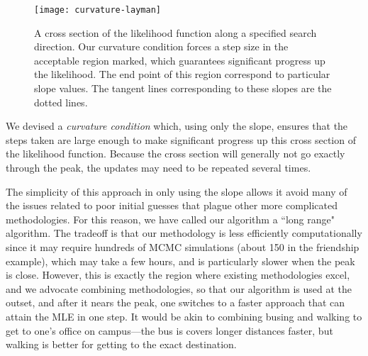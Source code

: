 \documentclass[12pt]{article}
\begin{document}
\begin{figure}[h!]
\centering
\texttt{[image: curvature-layman]}
\caption{A cross section of the likelihood function along a specified search direction.
Our curvature condition forces a step size in the 
acceptable region marked, which guarantees significant progress up the likelihood.
The end point of this region correspond to particular slope values.  
The tangent lines corresponding to these slopes are the dotted lines.
}
\label{F:curvature}
\end{figure}

We devised a \emph{curvature condition} which, using only the slope, ensures 
that the steps taken are large enough to make significant progress up this 
cross section of the likelihood function.  Because the cross section will generally
not go exactly through the peak, the updates may need to be repeated several times.

The simplicity of this approach in only using the slope allows it avoid 
many of the issues related to poor initial guesses that plague other 
more complicated methodologies.  For this reason, we have called our 
algorithm a ``long range" algorithm.
The tradeoff is that our methodology is less efficiently computationally
since it may require hundreds of MCMC simulations (about 150 in the friendship example), 
which may take a few hours, and is particularly slower when the peak 
is close.  However, this is exactly the region
where existing methodologies excel, and we advocate combining methodologies, 
so that our algorithm is used at the outset, and after it nears the peak, one 
switches to a faster approach that can attain the MLE in one step.  It would 
be akin to combining busing and walking to get to one's office on campus---the 
bus is covers longer distances faster, but walking is better for getting
to the exact destination. 
\end{document}
